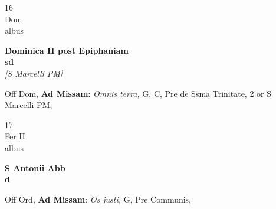 \documentclass[10pt, openany]{book}
\begin{document}
        \begin{center}
            \begin{minipage}{3.5in}
                \vspace{2em}
                \begin{minipage}{0.5in}
                    {\Huge 16} \\
                    {\normalsize Dom} \\
                    {\normalsize albus}
                \end{minipage}
                \begin{minipage}{3.0in}
                    \textbf{ \large Dominica II post Epiphaniam \\
                    \textnormal{\normalsize sd}} \\ \textit{[S Marcelli PM]} \\ 
                \end{minipage}
                \begin{justify}Off Dom, \textbf{Ad Missam}: \textit{Omnis terra,} G, C, Pre de Ssma Trinitate, 2 or S Marcelli PM,   
                \end{justify}
            \end{minipage}
        \end{center}
    
        \begin{center}
            \begin{minipage}{3.5in}
                \vspace{2em}
                \begin{minipage}{0.5in}
                    {\Huge 17} \\
                    {\normalsize Fer II} \\
                    {\normalsize albus}
                \end{minipage}
                \begin{minipage}{3.0in}
                    \textbf{ \large S Antonii Abb \\
                    \textnormal{\normalsize d}} \\ 
                \end{minipage}
                \begin{justify}Off Ord, \textbf{Ad Missam}: \textit{Os justi,} G, Pre Communis,   
                \end{justify}
            \end{minipage}
        \end{center}
    
\end{document}
